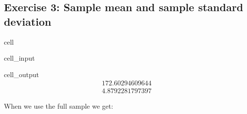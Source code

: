 \documentclass[letterpaper,10pt,english]{jupyterBook}
\begin{document}
\subsection{Exercise 3: Sample mean and sample standard deviation}
\label{\detokenize{exercises_unit_3:exercise-3-sample-mean-and-sample-standard-deviation}}
\begin{sphinxuseclass}{cell}\begin{sphinxVerbatimInput}

\begin{sphinxuseclass}{cell_input}
\begin{sphinxVerbatim}[commandchars=\\\{\}]


\PYG{p}{[}\PYG{p}{]}



\end{sphinxVerbatim}

\end{sphinxuseclass}\end{sphinxVerbatimInput}
\begin{sphinxVerbatimOutput}

\begin{sphinxuseclass}{cell_output}\begin{equation*}
\begin{split}172.60294609644\end{split}
\end{equation*}\begin{equation*}
\begin{split}4.8792281797397\end{split}
\end{equation*}
\end{sphinxuseclass}\end{sphinxVerbatimOutput}

\end{sphinxuseclass}
\sphinxAtStartPar
When we use the full sample we get:
\end{document}
